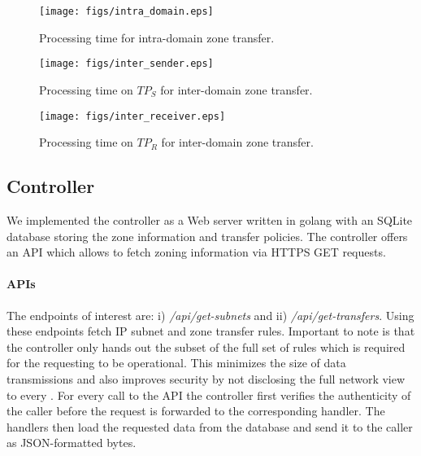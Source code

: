 
\begin{figure*}[!htb]
	\begin{minipage}{.32\linewidth}
		\centering
		\texttt{[image: figs/intra\_domain.eps]}
		\caption{Processing time for intra-domain zone transfer.}
		\label{fig:intra}
	\end{minipage}\hspace*{1em}
	\begin{minipage}{.32\linewidth}
		\centering
		\texttt{[image: figs/inter\_sender.eps]}
		\caption{Processing time on $TP_S$ for inter-domain zone transfer.}
		\label{fig:inter_sender}
	\end{minipage}\hspace*{1em}
	\begin{minipage}{.32\linewidth}
		\centering
		\texttt{[image: figs/inter\_receiver.eps]}
		\caption{Processing time on $TP_R$ for inter-domain zone transfer.}
		\label{fig:inter_receiver}
	\end{minipage}
\end{figure*}

\subsection{Controller}
\label{ssec:controller}

We implemented the controller as a Web server written in golang with an SQLite database storing the 
zone information and transfer policies. The controller offers an API which allows
\tps to fetch zoning information via HTTPS GET requests.

\paragraph{APIs}
The endpoints of interest are: i) \textit{/api/get-subnets} and ii) \textit{/api/get-transfers}.
Using these endpoints \tps fetch IP subnet and zone transfer rules. Important to note is that 
the controller only hands out the subset of the full set of rules which is required for the 
requesting \tp to be operational. This minimizes the size of data transmissions and also 
improves security by not disclosing the full network view to every \tp. For every call to the 
API the controller first verifies the authenticity of the caller before the request is forwarded 
to the corresponding handler. The handlers then load the requested data from the database and 
send it to the caller as JSON-formatted bytes.


